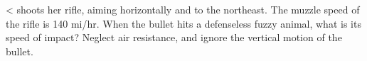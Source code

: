  <%
shoots her rifle, aiming horizontally and to the northeast.
The muzzle speed of the rifle is 140 mi/hr.  When the bullet
hits a defenseless fuzzy animal, what is its speed of
impact?  Neglect air resistance, and ignore the vertical
motion of the bullet.

